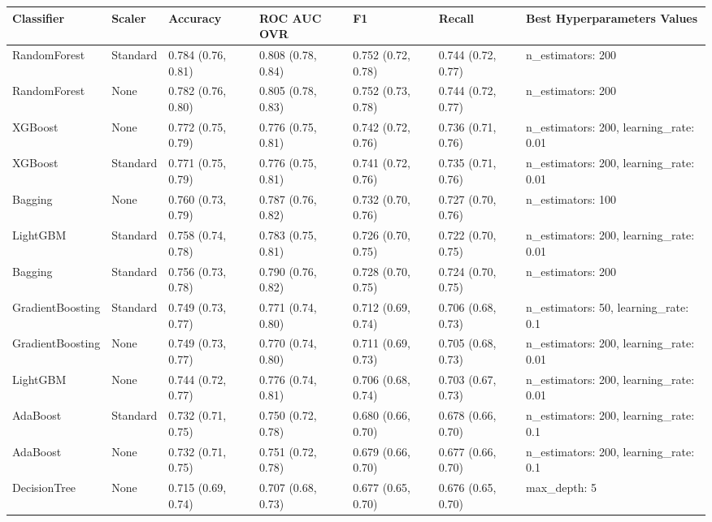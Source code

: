\begin{tabular}{lllllll}
\toprule
Classifier & Scaler & Accuracy & ROC AUC OVR & F1 & Recall & Best Hyperparameters Values \\
\midrule
RandomForest & Standard & 0.784 (0.76, 0.81) & 0.808 (0.78, 0.84) & 0.752 (0.72, 0.78) & 0.744 (0.72, 0.77) & {{n\_estimators: 200}} \\
RandomForest & None & 0.782 (0.76, 0.80) & 0.805 (0.78, 0.83) & 0.752 (0.73, 0.78) & 0.744 (0.72, 0.77) & {{n\_estimators: 200}} \\
XGBoost & None & 0.772 (0.75, 0.79) & 0.776 (0.75, 0.81) & 0.742 (0.72, 0.76) & 0.736 (0.71, 0.76) & {{n\_estimators: 200, learning\_rate: 0.01}} \\
XGBoost & Standard & 0.771 (0.75, 0.79) & 0.776 (0.75, 0.81) & 0.741 (0.72, 0.76) & 0.735 (0.71, 0.76) & {{n\_estimators: 200, learning\_rate: 0.01}} \\
Bagging & None & 0.760 (0.73, 0.79) & 0.787 (0.76, 0.82) & 0.732 (0.70, 0.76) & 0.727 (0.70, 0.76) & {{n\_estimators: 100}} \\
LightGBM & Standard & 0.758 (0.74, 0.78) & 0.783 (0.75, 0.81) & 0.726 (0.70, 0.75) & 0.722 (0.70, 0.75) & {{n\_estimators: 200, learning\_rate: 0.01}} \\
Bagging & Standard & 0.756 (0.73, 0.78) & 0.790 (0.76, 0.82) & 0.728 (0.70, 0.75) & 0.724 (0.70, 0.75) & {{n\_estimators: 200}} \\
GradientBoosting & Standard & 0.749 (0.73, 0.77) & 0.771 (0.74, 0.80) & 0.712 (0.69, 0.74) & 0.706 (0.68, 0.73) & {{n\_estimators: 50, learning\_rate: 0.1}} \\
GradientBoosting & None & 0.749 (0.73, 0.77) & 0.770 (0.74, 0.80) & 0.711 (0.69, 0.73) & 0.705 (0.68, 0.73) & {{n\_estimators: 200, learning\_rate: 0.01}} \\
LightGBM & None & 0.744 (0.72, 0.77) & 0.776 (0.74, 0.81) & 0.706 (0.68, 0.74) & 0.703 (0.67, 0.73) & {{n\_estimators: 200, learning\_rate: 0.01}} \\
AdaBoost & Standard & 0.732 (0.71, 0.75) & 0.750 (0.72, 0.78) & 0.680 (0.66, 0.70) & 0.678 (0.66, 0.70) & {{n\_estimators: 200, learning\_rate: 0.1}} \\
AdaBoost & None & 0.732 (0.71, 0.75) & 0.751 (0.72, 0.78) & 0.679 (0.66, 0.70) & 0.677 (0.66, 0.70) & {{n\_estimators: 200, learning\_rate: 0.1}} \\
DecisionTree & None & 0.715 (0.69, 0.74) & 0.707 (0.68, 0.73) & 0.677 (0.65, 0.70) & 0.676 (0.65, 0.70) & {{max\_depth: 5}} \\

\end{tabular}
